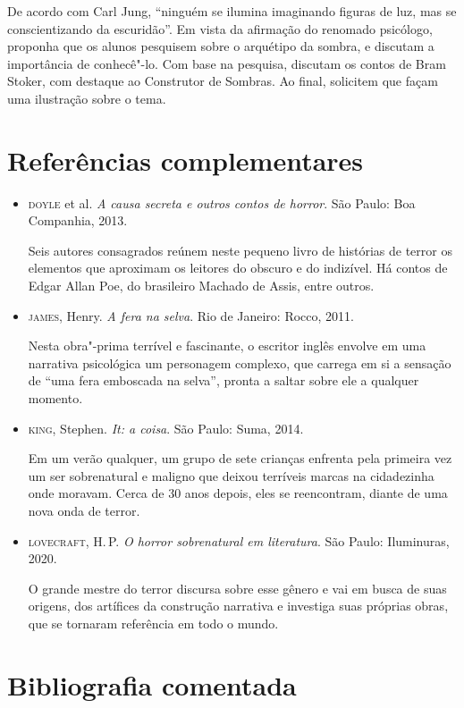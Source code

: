 \documentclass[12pt]{extarticle}
\begin{document}
De acordo com Carl Jung, ``ninguém se ilumina imaginando figuras de
luz, mas se conscientizando da escuridão''. Em vista da afirmação do
renomado psicólogo, proponha que os alunos pesquisem sobre o arquétipo
da sombra, e discutam a importância de conhecê"-lo. Com base na
pesquisa, discutam os contos de Bram Stoker, com destaque ao
Construtor de Sombras. Ao final, solicitem que façam uma ilustração
sobre o tema.

\section{Referências complementares}

\begin{itemize}
\item\textsc{doyle} et al. \textit{A causa secreta e outros contos de horror}. São
Paulo: Boa Companhia, 2013.

Seis autores consagrados reúnem neste pequeno livro de histórias de
terror os elementos que aproximam os leitores do obscuro e do indizível.
Há contos de Edgar Allan Poe, do brasileiro Machado de Assis, entre
outros.

\item\textsc{james}, Henry. \textit{A fera na selva}. Rio de Janeiro: Rocco, 2011.

Nesta obra"-prima terrível e fascinante, o escritor inglês envolve em uma
narrativa psicológica um personagem complexo, que carrega em si a
sensação de ``uma fera emboscada na selva'', pronta a saltar sobre ele a
qualquer momento.

\item\textsc{king}, Stephen. \textit{It: a coisa}. São Paulo: Suma, 2014.

Em um verão qualquer, um grupo de sete crianças enfrenta pela primeira
vez um ser sobrenatural e maligno que deixou terríveis marcas na
cidadezinha onde moravam. Cerca de 30 anos depois, eles se reencontram,
diante de uma nova onda de terror.

\item\textsc{lovecraft}, H.\,P. \textit{O horror sobrenatural em literatura}. São Paulo: Iluminuras, 2020.

O grande mestre do terror discursa sobre esse gênero e vai em busca de
suas origens, dos artífices da construção narrativa e investiga suas
próprias obras, que se tornaram referência em todo o mundo.
\end{itemize}

\section{Bibliografia comentada}
\end{document}
